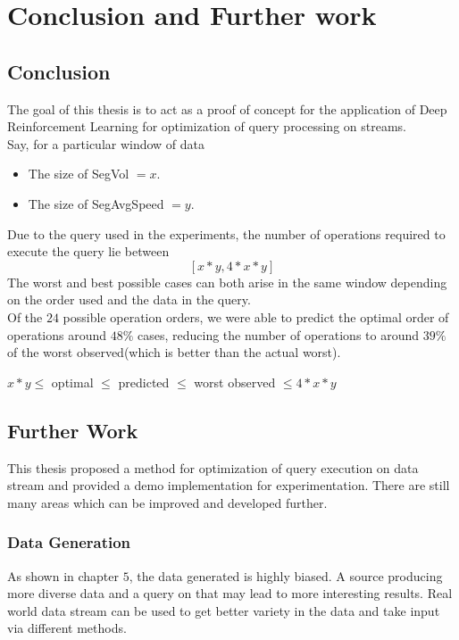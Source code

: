 \chapter{Conclusion and Further work}
\label{chapter:Conclusion_and_further_work}
\thispagestyle{myheadings}

\graphicspath{}

\section{Conclusion}
The goal of this thesis is to act as a proof of concept for the application of Deep Reinforcement Learning for optimization of query processing on streams.\\
Say, for a particular window of data 
\begin{itemize}
    \item The size of SegVol $=x$.
    \item The size of SegAvgSpeed $=y$.
\end{itemize}
Due to the query used in the experiments, the number of operations required to execute the query lie between 
$$[x*y,4*x*y]$$ 
The worst and best possible cases can both arise in the same window depending on the order used and the data in the query.\\
Of the $24$ possible operation orders, we were able to predict the optimal order of operations around $48\%$ cases, reducing the number of operations to around $39\%$ of the worst observed(which is better than the actual worst).
\begin{center}
$x*y \leq$ optimal $\leq$ predicted $\leq$ worst observed $\leq 4*x*y$
\end{center}

\section{Further Work}
This thesis proposed a method for optimization of query execution on data stream and provided a demo implementation for experimentation. There are still many areas which can be improved and developed further.

\subsection{Data Generation}
As shown in chapter $5$, the data generated is highly biased. A source producing more diverse data and a query on that may lead to more interesting results. Real world data stream can be used to get better variety in the data and take input via different methods.

